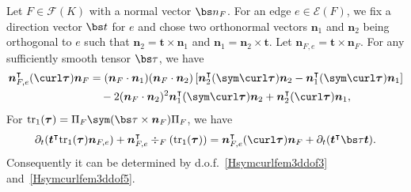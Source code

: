 \begin{lemma}\label{lem:symcurlkey}
Let $F\in\mathcal F(K)$ with a normal vector $\bs n_F$. For an edge $e\in\mathcal E(F)$, we fix a direction vector $\bs t$ for $e$ and chose two orthonormal vectors $\boldsymbol n_1$ and $\boldsymbol n_2$ being orthogonal to $e$ such that $\boldsymbol n_2=\boldsymbol t\times\boldsymbol n_1$ and $\boldsymbol n_1=\boldsymbol n_2\times\boldsymbol t$. Let $\boldsymbol n_{F,e}=\boldsymbol t \times\boldsymbol n_{F}$.
For any sufficiently smooth tensor $\bs\tau$, we have
\begin{align}
\boldsymbol n_{F,e}^{\intercal}(\curl\boldsymbol \tau)\boldsymbol n_F
&=(\boldsymbol n_F\cdot\boldsymbol n_1) (\boldsymbol n_F\cdot\boldsymbol n_2) \left [\boldsymbol n_{2}^{\intercal}(\sym\curl\boldsymbol \tau)\boldsymbol n_2-\boldsymbol n_{1}^{\intercal}(\sym\curl\boldsymbol \tau)\boldsymbol n_1\right ] \notag\\
&\quad - 2(\boldsymbol n_F\cdot\boldsymbol n_2)^2\boldsymbol n_{1}^{\intercal}(\sym\curl\boldsymbol \tau)\boldsymbol n_2 + \boldsymbol n_{2}^{\intercal}(\curl\boldsymbol \tau)\boldsymbol n_1, \label{eq:edgedofprop1}
\end{align}
For ${\rm tr}_1(\boldsymbol \tau)=\Pi_F\sym(\bs\tau\times\boldsymbol n_F)\Pi_F$, we have
\begin{equation}\label{eq:edgedofprop2}
\partial_{t}(\boldsymbol  t^{\intercal}{\rm tr}_1(\boldsymbol \tau)\boldsymbol  n_{F,e}) +\boldsymbol  n_{F,e}^{\intercal}\div_F({\rm tr}_1(\boldsymbol \tau)) = \boldsymbol n_{F,e}^{\intercal}(\curl\boldsymbol \tau)\boldsymbol n_F + \partial_{t}(\boldsymbol t^{\intercal}\bs\tau\boldsymbol t).
\end{equation}
Consequently it can be determined by d.o.f.~\eqref{Hsymcurlfem3ddof3} and~\eqref{Hsymcurlfem3ddof5}. 
\end{lemma}
